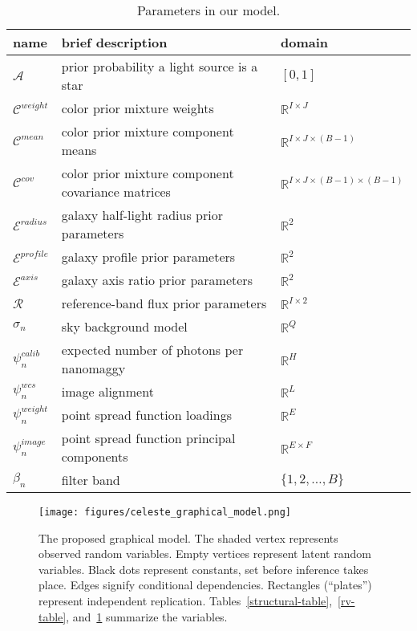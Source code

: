 \begin{table}
\centering
\caption{Parameters in our model.}
\centering
\begin{tabular}{lll}
\hline
\textbf{name} & \textbf{brief description}  & \textbf{domain} \\
\hline
$\mathcal A$           & prior probability a light source is a star & $[0, 1]$\\
$\mathcal C^{weight}$  & color prior mixture weights &  $\mathbb R^{I \times J}$\\
$\mathcal C^{mean}$    & color prior mixture component means &  $\mathbb R^{I \times J \times (B - 1)}$\\
$\mathcal C^{cov}$     & color prior mixture component covariance matrices &  $\mathbb R^{I \times J \times (B - 1)  \times (B - 1)}$\\
$\mathcal E^{radius}$  & galaxy half-light radius prior parameters  & $\mathbb R^2$\\
$\mathcal E^{profile}$ & galaxy profile prior parameters & $\mathbb R^2$\\
$\mathcal E^{axis}$    & galaxy axis ratio prior parameters & $\mathbb R^2$\\
$\mathcal R$           & reference-band flux prior parameters & $\mathbb R^{I \times 2}$\\
\hline
$\sigma_{n}$           & sky background model & $\mathbb R^Q$\\
$\psi_n^{calib}$       & expected number of photons per nanomaggy & $\mathbb R^H$\\
$\psi_n^{wcs}$         & image alignment & $\mathbb R^L$\\
$\psi_n^{weight}$      & point spread function loadings & $\mathbb R^E$\\
$\psi_n^{image}$       & point spread function principal components & $\mathbb R^{E \times F}$\\
$\beta_n $             & filter band & $\{1,2,\ldots,B\}$\\
\hline
\end{tabular}
\label{params-table}
\end{table}
\FloatBarrier

\begin{figure}[ht!]
	\texttt{[image: figures/celeste\_graphical\_model.png]}
	\caption{The proposed graphical model. The shaded vertex represents observed
		random variables. Empty vertices represent latent random variables.
		Black dots represent constants, set before inference takes place.
		Edges signify conditional dependencies. Rectangles
		(``plates'') represent independent replication.
		Tables~\ref{structural-table},~\ref{rv-table}, and~\ref{params-table} summarize the variables.
	}
	\label{graphical_model}
\end{figure}

